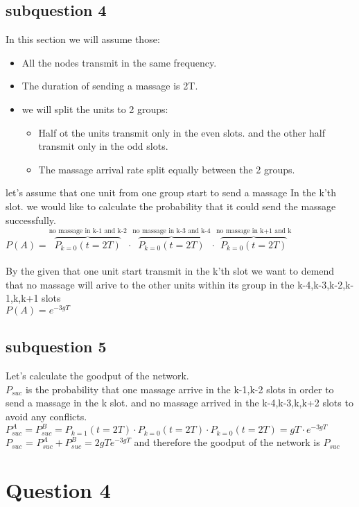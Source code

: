 \documentclass{article}
\begin{document}
\subsection{subquestion 4}
In this section we will assume those:
\begin{itemize}
    \item All the nodes transmit in the same frequency.
    \item The duration of sending a massage is 2T.
    \item we will split the units to 2 groups:
    \begin{itemize}
        \item Half ot the units transmit only in the even slots. and the other half transmit only in the odd slots.
        \item The massage arrival rate split equally between the 2 groups.
    \end{itemize}
\end{itemize}
let's assume that one unit from one group start to send a massage In the k'th slot. we would like to calculate the probability that it could send the massage successfully.\\
$P(A) =\overbrace{P_{k=0}(t=2T)}^{\text{no massage in k-1 and k-2}} \cdot \overbrace{P_{k=0}(t=2T)}^{\text{no massage in k-3 and k-4}} \cdot \overbrace{P_{k=0}(t=2T)}^{\text{no massage in k+1 and k}}$\\\\
By the given that one unit start transmit in the k'th slot we want to demend that no massage will arive to the other units within its group in the k-4,k-3,k-2,k-1,k,k+1 slots\\
$P(A) =  e^{-3gT}$

\subsection{subquestion 5}
Let's calculate the goodput of the network.\\
$P_{suc}$ is the probability that one massage arrive in the k-1,k-2 slots in order to send a massage in the k slot. and no massage arrived in the k-4,k-3,k,k+2 slots to avoid any conflicts.\\
$P^A_{suc}= P^B_{suc}= P_{k=1}(t=2T) \cdot P_{k=0}(t=2T) \cdot P_{k=0}(t=2T)= gT \cdot e^{-3gT}$\\
$P_{suc}$ = $P^A_{suc} + P^B_{suc} = 2gT e^{-3gT}$
and therefore the goodput of the network is $P_{suc}$  

\section{Question 4}
\end{document}
